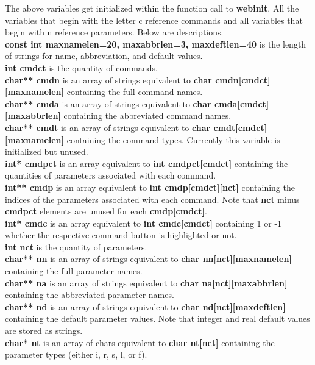 The above variables get initialized within the function call to \textbf{webinit}. All the variables that begin with the letter c reference
commands and all variables that begin with n reference parameters. Below are descriptions.\\
\textbf{const int maxnamelen=20, maxabbrlen=3, maxdeftlen=40} is the length of strings for name, abbreviation, and default values.\\
\textbf{int cmdct} is the quantity of commands.\\
\textbf{char** cmdn} is an array of strings equivalent to \textbf{char cmdn[cmdct][maxnamelen]} containing the full command names.\\
\textbf{char** cmda} is an array of strings equivalent to \textbf{char cmda[cmdct][maxabbrlen]} containing the abbreviated command names.\\
\textbf{char** cmdt} is an array of strings equivalent to \textbf{char cmdt[cmdct][maxnamelen]} containing the command types. Currently
this variable is initialized but unused.\\
\textbf{int* cmdpct} is an array equivalent to \textbf{int cmdpct[cmdct]} containing the quantities of parameters associated with each
command.\\
\textbf{int** cmdp} is an array equivalent to \textbf{int cmdp[cmdct][nct]} containing the indices of the parameters associated with each
command. Note that \textbf{nct} minus \textbf{cmdpct} elements are unused for each \textbf{cmdp[cmdct]}.\\
\textbf{int* cmdc} is an array equivalent to \textbf{int cmdc[cmdct]} containing 1 or -1 whether the respective command button is 
highlighted or not.\\
\textbf{int nct} is the quantity of parameters.\\
\textbf{char** nn} is an array of strings equivalent to \textbf{char nn[nct][maxnamelen]} containing the full parameter names.\\
\textbf{char** na} is an array of strings equivalent to \textbf{char na[nct][maxabbrlen]} containing the abbreviated parameter names.\\
\textbf{char** nd} is an array of strings equivalent to \textbf{char nd[nct][maxdeftlen]} containing the default parameter values. Note
that integer and real default values are stored as strings.\\
\textbf{char* nt} is an array of chars equivalent to \textbf{char nt[nct]} containing the parameter types (either i, r, s, l, or f).\\
